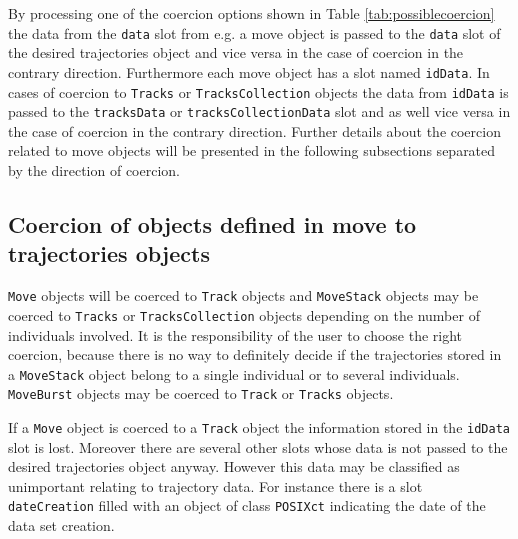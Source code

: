 \documentclass[12pt, oneside, a4paper]{scrbook}
\newcommand{\pkg}[1]{{\normalfont\fontseries{b}\selectfont #1}}
\let\code=\texttt
\begin{document}
\par\medskip

By processing one of the coercion options shown in Table \ref{tab:possiblecoercion} the data from the \code{data} slot from e.g. a \pkg{move} object is passed to the \code{data} slot of the desired \pkg{trajectories} object and vice versa in the case of coercion in the contrary direction.
Furthermore each \pkg{move} object has a slot named \code{idData}. In cases of coercion to \code{Tracks} or \code{TracksCollection} objects the data from \code{idData} is passed to the \code{tracksData} or \code{tracksCollectionData} slot and as well vice versa in the case of coercion in the contrary direction.
Further details about the coercion related to \pkg{move} objects will be presented in the following subsections separated by the direction of coercion.

\par\medskip



\subsection*{Coercion of objects defined in \pkg{move} to \pkg{trajectories} objects}
\label{subsec:coercemovetotraj}

\code{Move} objects will be coerced to \code{Track} objects and \code{MoveStack} objects may be coerced to \code{Tracks} or \code{TracksCollection} objects depending on the number of individuals involved. It is the responsibility of the user to choose the right coercion, because there is no way to definitely decide if the trajectories stored in a \code{MoveStack} object belong to a single individual or to several individuals. \code{MoveBurst} objects may be coerced to \code{Track} or \code{Tracks} objects.
\par\medskip

If a \code{Move} object is coerced to a \code{Track} object the information stored in the \code{idData} slot is lost. Moreover there are several other slots whose data is not passed to the desired \pkg{trajectories} object anyway. However this data may be classified as unimportant relating to trajectory data. For instance there is a slot \code{dateCreation} filled with an object of class \code{POSIXct} indicating the date of the data set creation.
\end{document}
